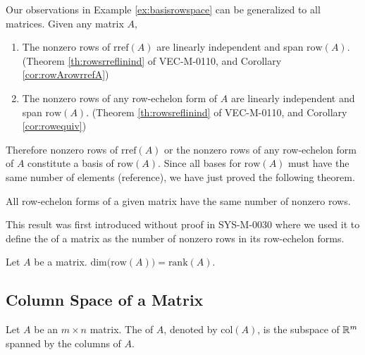 \documentclass{ximera}
\begin{document}
Our observations in Example \ref{ex:basisrowspace} can be generalized to all matrices.  Given any matrix $A$,
\begin{enumerate}
    \item The nonzero rows of $\mbox{rref}(A)$ are linearly independent and span $\mbox{row}(A)$.  (Theorem \ref{th:rowsrreflinind} of VEC-M-0110, and Corollary \ref{cor:rowArowrrefA})
    \item The nonzero rows of any row-echelon form of $A$ are linearly independent and span $\mbox{row}(A)$.  (Theorem \ref{th:rowsreflinind} of VEC-M-0110, and Corollary \ref{cor:rowequiv})
\end{enumerate}
Therefore nonzero rows of $\mbox{rref}(A)$ or the nonzero rows of any row-echelon form of $A$ constitute a basis of $\mbox{row}(A)$.  Since all bases for $\mbox{row}(A)$ must have the same number of elements ({\color{red}reference}), we have just proved the following theorem.

\begin{theorem}\label{th:samenumberofnonzerorows}
All row-echelon forms of a given matrix have the same number of nonzero rows.
\end{theorem}

This result was first introduced without proof in SYS-M-0030 where we used it to define the  of a matrix as the number of nonzero rows in its row-echelon forms.

\begin{theorem}\label{th:dimofrowA}
Let $A$ be a matrix.  
$\mbox{dim}\Big(\mbox{row}(A)\Big)=\mbox{rank}(A)$.
\end{theorem}


\subsection*{Column Space of a Matrix}
\begin{definition}\label{def:colspace} Let $A$ be an $m\times n$ matrix.  The  of $A$, denoted by $\mbox{col}(A)$, is the subspace of $\mathbb{R}^m$ spanned by the columns of $A$.
\end{definition}
\end{document}

